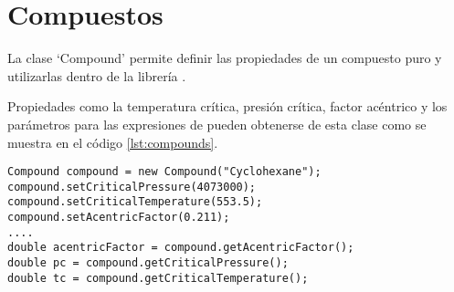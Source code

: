 \section{Compuestos}\label{sec:compounds}

La clase `Compound' permite definir las propiedades de un compuesto puro y utilizarlas dentro de la librería \Materia.

Propiedades como la temperatura crítica, presión crítica, factor acéntrico y los parámetros para las expresiones de \alfa pueden obtenerse de esta clase como se muestra en el código \ref{lst:compounds}.

\begin{lstlisting}[caption={Se muestra la creación de un objeto tipo `Compound' para definir y utilizar las propiedades del cyclohexano, haciendo uso de los métodos `get' y `set'.},label={lst:compounds}]
Compound compound = new Compound("Cyclohexane");
compound.setCriticalPressure(4073000);
compound.setCriticalTemperature(553.5);
compound.setAcentricFactor(0.211);
....
double acentricFactor = compound.getAcentricFactor();
double pc = compound.getCriticalPressure();
double tc = compound.getCriticalTemperature();
\end{lstlisting}






